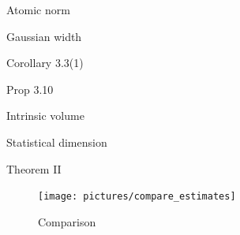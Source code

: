 
\begin{definition}
    Atomic norm
\end{definition}

\begin{definition}
    Gaussian width
\end{definition}

\begin{proposition}
    Corollary 3.3(1)
\end{proposition}

\begin{proposition}
    Prop 3.10
\end{proposition}


\begin{definition}
    Intrinsic volume
\end{definition}

\begin{definition}
    Statistical dimension
\end{definition}

\begin{theorem}
    Theorem II
\end{theorem}


\begin{figure}
    \centering
    \texttt{[image: pictures/compare\_estimates]}
    \caption{Comparison}
    \label{fig:compare}
\end{figure}